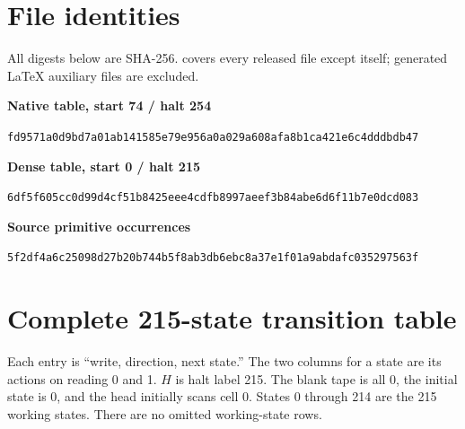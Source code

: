 \documentclass[11pt,a4paper]{article}
\theoremstyle{remark}\newtheorem{remark}[theorem]{Remark}
\newcommand{\file}[1]{\texttt{\path{#1}}}
\begin{document}
\appendix
\section{File identities}
All digests below are SHA-256. \file{MANIFEST.json} covers every released file except itself; generated LaTeX auxiliary files are excluded.\par
\textbf{Native table, start 74 / halt 254}\par
\texttt{fd9571a0d9bd7a01ab141585e79e956a0a029a608afa8b1ca421e6c4dddbdb47}

\textbf{Dense table, start 0 / halt 215}\par
\texttt{6df5f605cc0d99d4cf51b8425eee4cdfb8997aeef3b84abe6d6f11b7e0dcd083}

\textbf{Source primitive occurrences}\par
\texttt{5f2df4a6c25098d27b20b744b5f8ab3db6ebc8a37e1f01a9abdafc035297563f}

\clearpage
\section{Complete 215-state transition table}\label{app:table}
Each entry is ``write, direction, next state.'' The two columns for a state are its actions on reading 0 and 1. $H$ is halt label 215. The blank tape is all 0, the initial state is 0, and the head initially scans cell 0. States 0 through 214 are the 215 working states. There are no omitted working-state rows.


\end{document}
